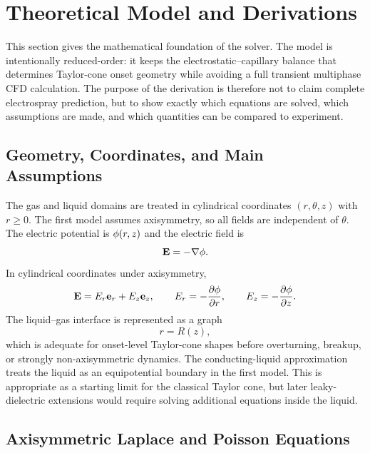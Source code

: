\section{Theoretical Model and Derivations}

This section gives the mathematical foundation of the solver. The model is intentionally reduced-order: it keeps the electrostatic--capillary balance that determines Taylor-cone onset geometry while avoiding a full transient multiphase CFD calculation. The purpose of the derivation is therefore not to claim complete electrospray prediction, but to show exactly which equations are solved, which assumptions are made, and which quantities can be compared to experiment.

\subsection{Geometry, Coordinates, and Main Assumptions}

The gas and liquid domains are treated in cylindrical coordinates $(r,\theta,z)$ with $r\ge 0$. The first model assumes axisymmetry, so all fields are independent of $\theta$. The electric potential is $\phi(r,z)$ and the electric field is
\begin{equation}
    \mathbf{E}=-\nabla\phi.
\end{equation}
In cylindrical coordinates under axisymmetry,
\begin{equation}
    \mathbf{E}=E_r\mathbf{e}_r+E_z\mathbf{e}_z,
    \qquad
    E_r=-\frac{\partial\phi}{\partial r},
    \qquad
    E_z=-\frac{\partial\phi}{\partial z}.
\end{equation}
The liquid--gas interface is represented as a graph
\begin{equation}
    r=R(z),
\end{equation}
which is adequate for onset-level Taylor-cone shapes before overturning, breakup, or strongly non-axisymmetric dynamics. The conducting-liquid approximation treats the liquid as an equipotential boundary in the first model. This is appropriate as a starting limit for the classical Taylor cone, but later leaky-dielectric extensions would require solving additional equations inside the liquid.

\subsection{Axisymmetric Laplace and Poisson Equations}


